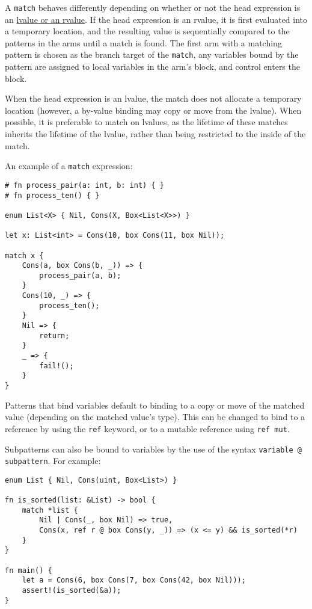 \documentclass[]{article}
\begin{document}
A \texttt{match} behaves differently depending on whether or not the
head expression is an \hyperref[lvalues-rvalues-and-temporaries]{lvalue
or an rvalue}. If the head expression is an rvalue, it is first
evaluated into a temporary location, and the resulting value is
sequentially compared to the patterns in the arms until a match is
found. The first arm with a matching pattern is chosen as the branch
target of the \texttt{match}, any variables bound by the pattern are
assigned to local variables in the arm's block, and control enters the
block.

When the head expression is an lvalue, the match does not allocate a
temporary location (however, a by-value binding may copy or move from
the lvalue). When possible, it is preferable to match on lvalues, as the
lifetime of these matches inherits the lifetime of the lvalue, rather
than being restricted to the inside of the match.

An example of a \texttt{match} expression:

\begin{verbatim}
# fn process_pair(a: int, b: int) { }
# fn process_ten() { }

enum List<X> { Nil, Cons(X, Box<List<X>>) }

let x: List<int> = Cons(10, box Cons(11, box Nil));

match x {
    Cons(a, box Cons(b, _)) => {
        process_pair(a, b);
    }
    Cons(10, _) => {
        process_ten();
    }
    Nil => {
        return;
    }
    _ => {
        fail!();
    }
}
\end{verbatim}

Patterns that bind variables default to binding to a copy or move of the
matched value (depending on the matched value's type). This can be
changed to bind to a reference by using the \texttt{ref} keyword, or to
a mutable reference using \texttt{ref mut}.

Subpatterns can also be bound to variables by the use of the syntax
\texttt{variable @ subpattern}. For example:

\begin{verbatim}
enum List { Nil, Cons(uint, Box<List>) }

fn is_sorted(list: &List) -> bool {
    match *list {
        Nil | Cons(_, box Nil) => true,
        Cons(x, ref r @ box Cons(y, _)) => (x <= y) && is_sorted(*r)
    }
}

fn main() {
    let a = Cons(6, box Cons(7, box Cons(42, box Nil)));
    assert!(is_sorted(&a));
}
\end{verbatim}
\end{document}
